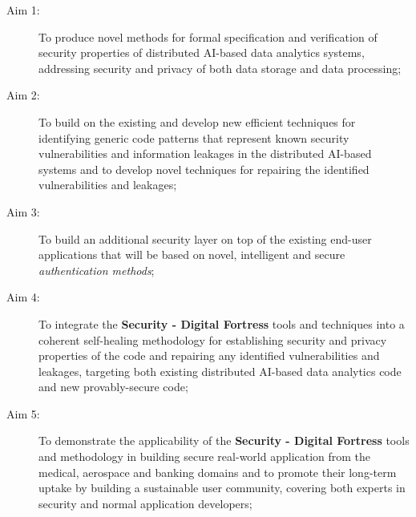 \documentclass[a4paper,11pt]{article}
\newcommand{\project}[1]{\textbf{#1}\xspace}
\newcommand{\SECURITY}{\project{Security - Digital Fortress}}
\newcommand{\TheProject}{\SECURITY}
\begin{document}
\begin{description}
\item[Aim 1:] To produce novel methods for formal specification and verification of security properties of
  distributed AI-based data analytics systems, addressing security and privacy of both data storage and data processing;

\item[Aim 2:] To build on the existing and develop new efficient techniques for identifying generic code patterns that
  represent known security vulnerabilities and information leakages in the distributed AI-based systems and to develop novel techniques for  
  repairing the identified vulnerabilities and leakages;

\item[Aim 3:] To build an additional security layer on top of the existing end-user applications that will be based on novel, intelligent and secure \emph{authentication methods};

\item[Aim 4:] To integrate the \TheProject{} tools and techniques into a coherent self-healing methodology for establishing
  security and privacy properties of the code and repairing any identified vulnerabilities and leakages, targeting both 
  existing distributed AI-based data analytics code and new provably-secure code;

\item[Aim 5:]  To demonstrate the applicability of the \TheProject{} tools and
 methodology in building secure real-world application from the medical, aerospace and
 banking domains and to promote their long-term uptake by building a sustainable user community,
 covering both experts in security and normal application developers;

\end{description}
\end{document}

